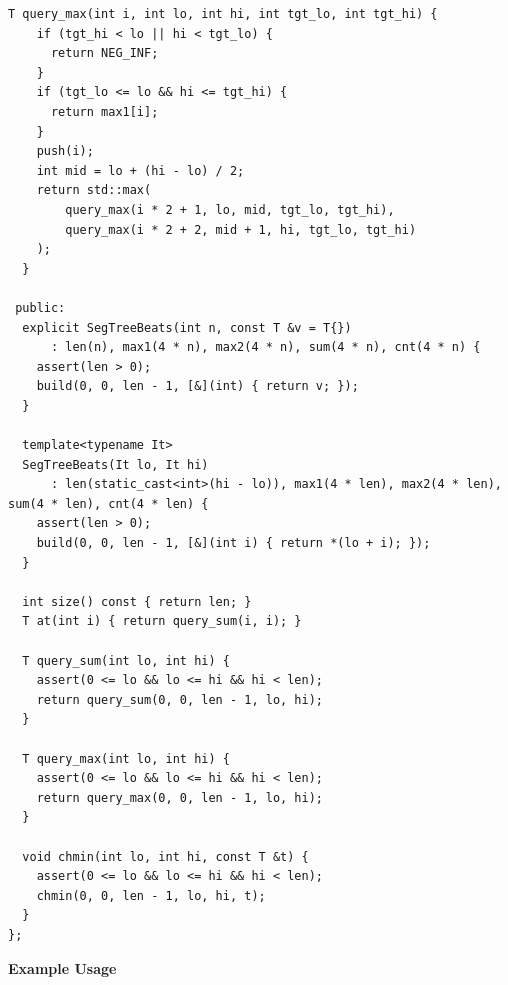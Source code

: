\begin{lstlisting}[style=cpp]
  T query_max(int i, int lo, int hi, int tgt_lo, int tgt_hi) {
    if (tgt_hi < lo || hi < tgt_lo) {
      return NEG_INF;
    }
    if (tgt_lo <= lo && hi <= tgt_hi) {
      return max1[i];
    }
    push(i);
    int mid = lo + (hi - lo) / 2;
    return std::max(
        query_max(i * 2 + 1, lo, mid, tgt_lo, tgt_hi),
        query_max(i * 2 + 2, mid + 1, hi, tgt_lo, tgt_hi)
    );
  }

 public:
  explicit SegTreeBeats(int n, const T &v = T{})
      : len(n), max1(4 * n), max2(4 * n), sum(4 * n), cnt(4 * n) {
    assert(len > 0);
    build(0, 0, len - 1, [&](int) { return v; });
  }

  template<typename It>
  SegTreeBeats(It lo, It hi)
      : len(static_cast<int>(hi - lo)), max1(4 * len), max2(4 * len), sum(4 * len), cnt(4 * len) {
    assert(len > 0);
    build(0, 0, len - 1, [&](int i) { return *(lo + i); });
  }

  int size() const { return len; }
  T at(int i) { return query_sum(i, i); }

  T query_sum(int lo, int hi) {
    assert(0 <= lo && lo <= hi && hi < len);
    return query_sum(0, 0, len - 1, lo, hi);
  }

  T query_max(int lo, int hi) {
    assert(0 <= lo && lo <= hi && hi < len);
    return query_max(0, 0, len - 1, lo, hi);
  }

  void chmin(int lo, int hi, const T &t) {
    assert(0 <= lo && lo <= hi && hi < len);
    chmin(0, 0, len - 1, lo, hi, t);
  }
};
\end{lstlisting}
\textbf{Example Usage}\par

